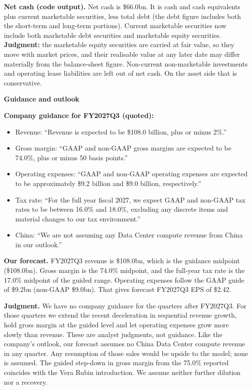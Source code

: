 \documentclass[a4paper,10pt]{article}
\begin{document}
\textbf{Net cash (code output).} Net cash is \$66.0bn. It is cash and cash equivalents plus current marketable securities, less total debt (the debt figure includes both the short-term and long-term portions). Current marketable securities now include both marketable debt securities and marketable equity securities. \textbf{Judgment:} the marketable equity securities are carried at fair value, so they move with market prices, and their realisable value at any later date may differ materially from the balance-sheet figure. Non-current non-marketable investments and operating lease liabilities are left out of net cash. On the asset side that is conservative.

\par\smallskip\textbf{\color{MemoBlue}Guidance and outlook}\par

\textbf{Company guidance for FY2027Q3 (quoted):}

\begin{itemize}\setlength{\itemsep}{1pt}
\item Revenue: “Revenue is expected to be \$108.0 billion, plus or minus 2\%.”
\item Gross margin: “GAAP and non-GAAP gross margins are expected to be 74.0\%, plus or minus 50 basis points.”
\item Operating expenses: “GAAP and non-GAAP operating expenses are expected to be approximately \$9.2 billion and \$9.0 billion, respectively.”
\item Tax rate: “For the full year fiscal 2027, we expect GAAP and non-GAAP tax rates to be between 16.0\% and 18.0\%, excluding any discrete items and material changes to our tax environment.”
\item China: “We are not assuming any Data Center compute revenue from China in our outlook.”
\end{itemize}

\textbf{Our forecast.} FY2027Q3 revenue is \$108.0bn, which is the guidance midpoint (\$108.0bn). Gross margin is the 74.0\% midpoint, and the full-year tax rate is the 17.0\% midpoint of the guided range. Operating expenses follow the GAAP guide of \$9.2bn (non-GAAP \$9.0bn). That gives forecast FY2027Q3 EPS of \$2.42.

\textbf{Judgment.} We have no company guidance for the quarters after FY2027Q3. For those quarters we extend the recent deceleration in sequential revenue growth, hold gross margin at the guided level and let operating expenses grow more slowly than revenue. These are analyst judgments, not guidance. Like the company's outlook, our forecast assumes no China Data Center compute revenue in any quarter. Any resumption of those sales would be upside to the model; none is assumed. The guided step-down in gross margin from the 75.0\% reported coincides with the Vera Rubin introduction. We assume neither further dilution nor a recovery.
\end{document}
